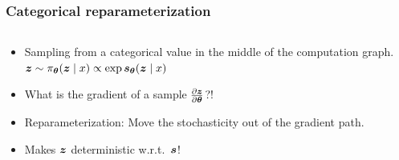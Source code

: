 \begin{frame}
\frametitle{Categorical reparameterization}%
\centering
\begin{columns}[T]
\begin{column}[T]{.5\textwidth}
\begin{itemize}
    \item<2-> Sampling from a categorical value in the middle of the computation graph.\\
    $\boldsymbol{z} \sim \pi_{\boldsymbol{\theta}}(\boldsymbol{z} \mid x) \propto \exp \boldsymbol{s}_{\boldsymbol{\theta}}(\boldsymbol{z} \mid x)$
    \item<3-> What is the gradient of a sample $\frac{\partial \boldsymbol{z}}{\partial \boldsymbol{\theta}}$?!
    \item<4-> Reparameterization:
    Move the stochasticity out of the gradient path.
    \item<5-> Makes $\boldsymbol{z}$ deterministic w.r.t.\ $\boldsymbol{s}$!


\end{itemize}
\end{column}
\end{columns}
\end{frame}
